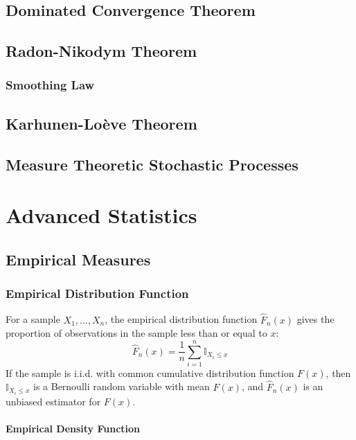 \documentclass[11pt]{report} %
\begin{document}
\section{Dominated Convergence Theorem}

\section{Radon-Nikodym Theorem}

\subsection{Smoothing Law}

\section{Karhunen-Lo\`eve Theorem}

\section{Measure Theoretic Stochastic Processes}

\chapter{Advanced Statistics}

\section{Empirical Measures}

\subsection{Empirical Distribution Function}

For a sample $X_{1}, \dots, X_{n}$, the empirical distribution function $\widehat{F}_{n}\left(x\right)$ gives the proportion of observations in the sample less than or equal to $x$:
\begin{equation}
\widehat{F}_{n}\left(x\right) = \dfrac{1}{n}\sum_{i = 1}^{n}\mathbb{I}_{X_{i} \leq x}
\end{equation}
If the sample is i.i.d. with common cumulative distribution function $F\left(x\right)$, then $\mathbb{I}_{X_{i} \leq x}$ is a Bernoulli random variable with mean $F\left(x\right)$, and $\widehat{F}_{n}\left(x\right)$ is an unbiased estimator for $F\left(x\right)$.

\subsubsection{Empirical Density Function}
\end{document}
